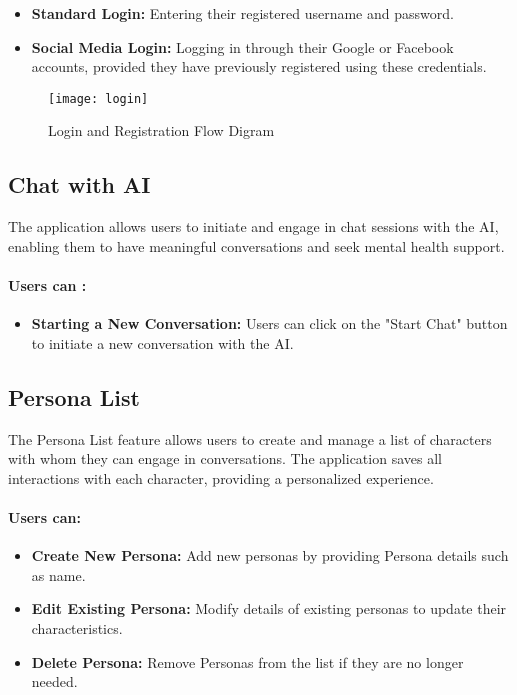 \begin{itemize}
    \item \textbf{Standard Login:} Entering their registered username and password.
    \item \textbf{Social Media Login:} Logging in through their Google or Facebook accounts, provided they have previously registered using these credentials.
\end{itemize}

\begin{figure}[h]
    \texttt{[image: login]}
    \caption{Login and Registration Flow Digram}  
    \centering
    \end{figure}



\subsection{Chat with AI}

The application allows users to initiate and engage in chat sessions with the AI, enabling them to have meaningful conversations and seek mental health support.

\paragraph{Users can :}

\begin{itemize}
    \item \textbf{Starting a New Conversation:} Users can click on the "Start Chat" button to initiate a new conversation with the AI. 
\end{itemize}

\subsection{Persona List}

The Persona List feature allows users to create and manage a list of characters with whom they can engage in conversations. The application saves all interactions with each character, providing a personalized experience.

\paragraph{Users can:}

\begin{itemize}
    \item \textbf{Create New Persona:} Add new personas by providing Persona details such as name.
    \item \textbf{Edit Existing Persona:} Modify details of existing personas to update their characteristics.
    \item \textbf{Delete Persona:} Remove Personas from the list if they are no longer needed.
\end{itemize}



